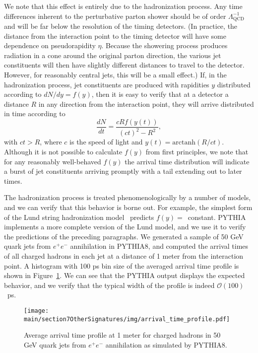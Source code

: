 We note that this effect is entirely due to the hadronization process.
Any time differences inherent to the perturbative parton shower should be of order $\Lambda_\mathrm{QCD}^{-1}$ and will be far below the resolution of the timing detectors.
(In practice, the distance from the interaction point to the timing detector will have some dependence on pseudorapidity $\eta$.
Because the showering process produces radiation in a cone around the original parton direction, the various jet constituents will then have slightly different distances to travel to the detector.
However, for reasonably central jets, this will be a small effect.)
If, in the hadronization process, jet constituents are produced with rapidities $y$ distributed according to $dN/dy = f(y)$, then it is easy to verify that at a detector a distance $R$ in any direction from the interaction point, they will arrive distributed in time according to 
\begin{equation}
	\frac{dN}{dt} = \frac{ cR f(y(t)) }{ (ct)^2-R^2},
\end{equation}
with $ct>R$, where $c$ is the speed of light and $y(t)=\mathrm{arctanh}(R/ct)$.
Although it is not possible to calculate $f(y)$ from first principles, we note that for any reasonably well-behaved $f(y)$ the arrival time distribution will indicate a burst of jet constituents arriving promptly with a tail extending out to later times.

The hadronization process is treated phenomenologically by a number of models, and we can verify that this behavior is borne out.
For example, the simplest form of the Lund string hadronization model~\cite{Andersson:1983ia} predicts $f(y)=$~constant.
PYTHIA implements a more complete version of the Lund model, and we use it to verify the predictions of the preceding paragraphs.
We generated a sample of 50 GeV quark jets from $e^+e^-$ annihilation in PYTHIA8, and computed the arrival times of all charged hadrons in each jet at a distance of 1 meter from the interaction point.
A histogram with 100 ps bin size of the averaged arrival time profile is shown in Figure~\ref{fig:pythia_arrival_profile}.
We can see that the PYTHIA output displays the expected behavior, and we verify that the typical width of the profile is indeed $\mathcal O(100)$~ps.

\begin{figure}
	\begin{center}
		\texttt{[image: \\main/section7OtherSignatures/img/arrival\_time\_profile.pdf]}
	\end{center}
	\caption{Average arrival time profile at 1 meter for charged hadrons in 50 GeV quark jets from $e^+e^-$ annihilation as simulated by PYTHIA8.}
\label{fig:pythia_arrival_profile} 
\end{figure}

